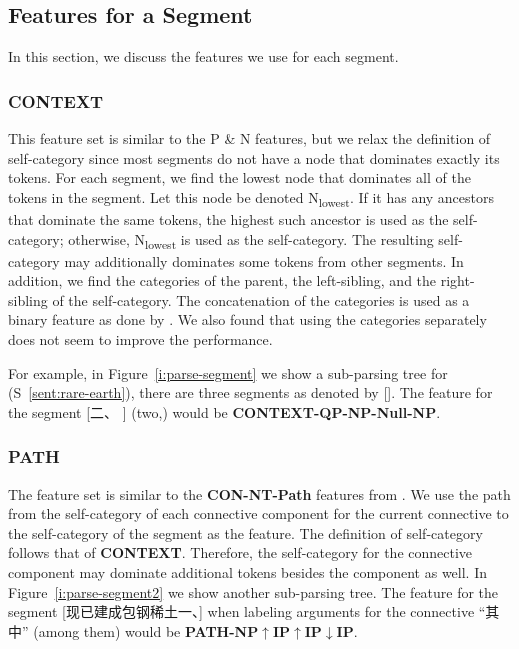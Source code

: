 \subsection{Features for a Segment}

In this section, we discuss the features we use for each segment.

\subsubsection{CONTEXT}

This feature set is similar to the P \& N features, but we relax the
definition of self-category since most segments do not have a node that
dominates exactly its tokens. For each segment, we find the lowest node
that dominates all of the tokens in the segment.
Let this node be denoted N\textsubscript{lowest}.
If it has any ancestors
that dominate the same tokens, the highest such ancestor is used as
the self-category; otherwise, N\textsubscript{lowest} is used as the self-category.
The resulting self-category may additionally dominates
some tokens from other segments.
In addition, we find the categories of the parent, the left-sibling, and
the right-sibling of the self-category. The concatenation of the categories is
used as a binary feature as done by \cite{kong2014a}. We also found that
using the categories separately does not seem to improve the performance.

For example, in Figure~\ref{i:parse-segment} we show a sub-parsing tree for
(S~\ref{sent:rare-earth}), there are three segments as denoted by [].
The feature for the segment [二、 ] (two,) would be
\textbf{CONTEXT-QP-NP-Null-NP}.



\subsubsection{PATH}

The feature set is similar to the \textbf{CON-NT-Path} features
from \cite{kong2014a}.
We use the path from the self-category of each connective component for the
current connective to the self-category of the segment as the feature. The
definition of self-category follows that of \textbf{CONTEXT}. Therefore,
the self-category for the connective component may dominate additional tokens
besides the component as well.
In Figure~\ref{i:parse-segment2} we show another sub-parsing tree.
The feature for the segment [现已建成包钢稀土一、] when labeling arguments
for the connective ``其中'' (among them) would be
\textbf{PATH-NP$\uparrow$IP$\uparrow$IP$\downarrow$IP}.

